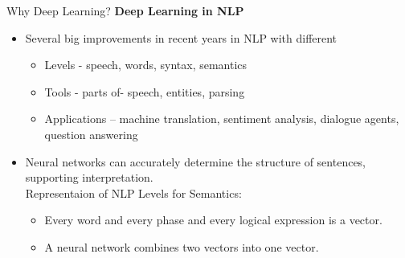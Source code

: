 \documentclass[10pt]{beamer}
\begin{document}
	\begin{frame}[c]{Why Deep Learning?}
		\textbf{Deep Learning in NLP}
		\begin{itemize}
			\item Several big improvements in recent years in NLP with different
				\begin{itemize}
					\item Levels - speech, words, syntax, semantics
					\item Tools - parts of- speech, entities, parsing
					\item Applications – machine translation, sentiment analysis, dialogue agents, question answering
				\end{itemize}
			\item Neural networks can accurately determine the structure of sentences, supporting interpretation.\\
			Representaion of NLP Levels for Semantics:
				\begin{itemize}
					\item Every word and every phase and every logical expression is a vector.
					\item A neural network combines two vectors into one vector.
				\end{itemize}
		\end{itemize}
	\end{frame}
\end{document}
